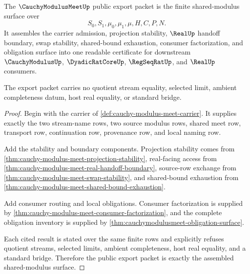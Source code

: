 \begin{theorem}
\label{thm:cauchy-modulus-meet-public-export-surface}
The $\CauchyModulusMeetUp$ public export packet is the finite shared-modulus surface over
$$
S_0,S_1,\mu_0,\mu_1,\mu,H,C,P,N.
$$
It assembles the carrier admission, projection stability, $\RealUp$ handoff boundary, swap stability, shared-bound exhaustion, consumer factorization, and obligation surface into one readable certificate for downstream $\CauchyModulusUp$, $\DyadicRatCoreUp$, $\RegSeqRatUp$, and $\RealUp$ consumers.

The export packet carries no quotient stream equality, selected limit, ambient completeness datum, host real equality, or standard bridge.
\end{theorem}
\begin{proof}
Begin with the carrier of \autoref{def:cauchy-modulus-meet-carrier}. It supplies exactly the two stream-name rows, two source modulus rows, shared meet row, transport row, continuation row, provenance row, and local naming row.

Add the stability and boundary components. Projection stability comes from \autoref{thm:cauchy-modulus-meet-projection-stability}, real-facing access from \autoref{thm:cauchy-modulus-meet-real-handoff-boundary}, source-row exchange from \autoref{thm:cauchy-modulus-meet-swap-stability}, and shared-bound exhaustion from \autoref{thm:cauchy-modulus-meet-shared-bound-exhaustion}.

Add consumer routing and local obligations. Consumer factorization is supplied by \autoref{thm:cauchy-modulus-meet-consumer-factorization}, and the complete obligation inventory is supplied by \autoref{thm:cauchymodulusmeet-obligation-surface}.

Each cited result is stated over the same finite rows and explicitly refuses quotient streams, selected limits, ambient completeness, host real equality, and a standard bridge. Therefore the public export packet is exactly the assembled shared-modulus surface.
\end{proof}

